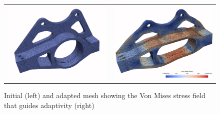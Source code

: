 \begin{figure}
\centering
\begin{tabular}{cc}
  \includegraphics[width=.5\textwidth]{albany1.png}&
  \includegraphics[width=.5\textwidth]{albany2.png}
\end{tabular}
\caption{Initial (left) and adapted mesh showing the Von Mises stress field that
guides adaptivity (right)} \label{fig:albany-mesh}
\end{figure}

